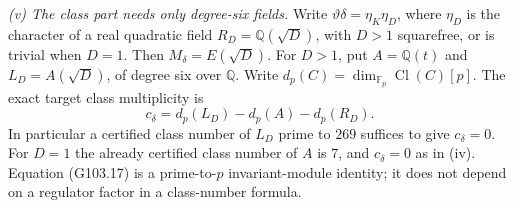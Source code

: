 \begin{theorem}
\emph{(v) The class part needs only degree-six fields.}
Write $\vartheta\delta=\eta_K\eta_D$, where
$\eta_D$ is the character of a real quadratic field
$R_D=\mathbb Q(\sqrt D)$, with $D>1$ squarefree, or is trivial
when $D=1$.
Then $M_\delta=E(\sqrt D)$.
For $D>1$, put $A=\mathbb Q(t)$ and
$L_D=A(\sqrt D)$, of degree six over $\mathbb Q$.
Write $d_p(C)=\dim_{\mathbb F_p}\operatorname{Cl}(C)[p]$.
The exact target class multiplicity is
\[
              c_\delta=d_p(L_D)-d_p(A)-d_p(R_D).
 \tag{G103.17}
\]
In particular a certified class number of $L_D$ prime to $269$
suffices to give $c_\delta=0$.
For $D=1$ the already certified class number of $A$ is $7$,
and $c_\delta=0$ as in (iv).
Equation (G103.17) is a prime-to-$p$ invariant-module identity;
it does not depend on a regulator factor in a class-number formula.
\end{theorem}

